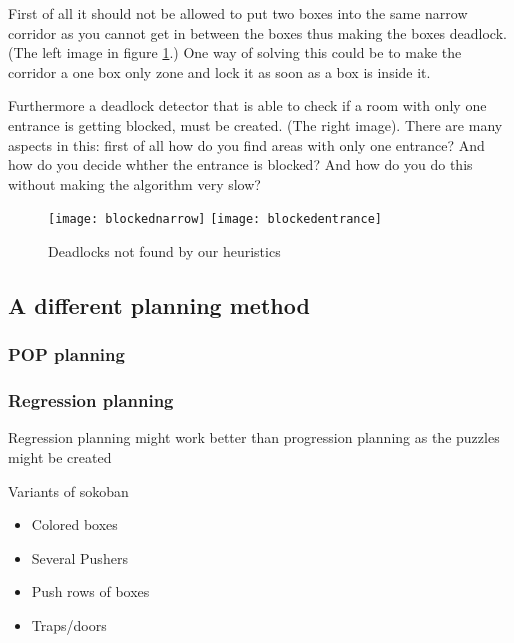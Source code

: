 First of all it should not be allowed to put two boxes into the same
narrow corridor as you cannot get in between the boxes thus making the
boxes deadlock. (The left image in figure \ref{fig:missingdeadlocks}.)
One way of solving this could be to make the corridor a one box only
zone and lock it as soon as a box is inside it.

Furthermore a deadlock detector that is able to check if a room with
only one entrance is getting blocked, must be created. (The right
image). There are many aspects in this: first of all how do you find
areas with only one entrance? And how do you decide whther the
entrance is blocked? And how do you do this without making the
algorithm very slow?

\begin{figure}[htp]
  \centering
  \texttt{[image: blockednarrow]}
  \texttt{[image: blockedentrance]}
  \caption{Deadlocks not found by our heuristics}
  \label{fig:missingdeadlocks}
\end{figure}

\subsection{A different planning method}
\subsubsection{POP planning}
\subsubsection{Regression planning}
Regression planning might work better than progression planning as the puzzles might be created 

Variants of sokoban
\begin{itemize}
\item Colored boxes
\item Several Pushers
\item Push rows of boxes
\item Traps/doors
\end{itemize}

